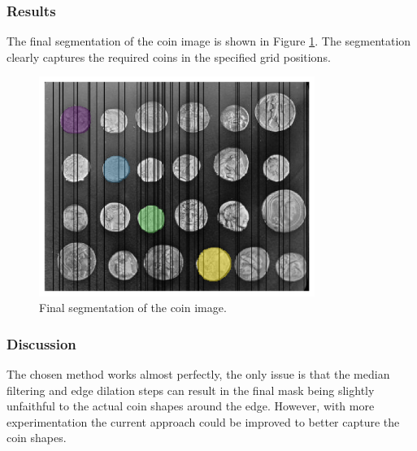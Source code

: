 \documentclass[11pt]{article}
\begin{document}
\subsubsection{Results}
The final segmentation of the coin image is shown in Figure \ref{fig:q1c_selected_coins}. The segmentation clearly captures the required coins in the specified grid positions.  

\begin{figure}[H]
    \centering
    \includegraphics[width=0.8\textwidth]{figs/q1c.png}
    \caption{Final segmentation of the coin image.}
    \label{fig:q1c_selected_coins}
\end{figure}

\subsubsection{Discussion}
The chosen method works almost perfectly, the only issue is that the median filtering and edge dilation steps can result in the final mask being slightly unfaithful to the actual coin shapes around the edge. However, with more experimentation the current approach could be improved to better capture the coin shapes.
\end{document}
